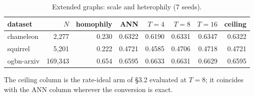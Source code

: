 \begin{table}[t]
\centering
\small
\caption{Extended graphs: scale and heterophily (7 seeds).}
\label{tab:ext}
\begin{tabular}{lrrrrrrr}
\toprule
dataset & $N$ & homophily & ANN & $T=4$ & $T=8$ & $T=16$ & ceiling \\
\midrule
chameleon & 2,277 & 0.230 & 0.6322 & 0.6190 & 0.6331 & 0.6347 & 0.6322 \\
squirrel & 5,201 & 0.222 & 0.4721 & 0.4585 & 0.4706 & 0.4718 & 0.4721 \\
ogbn-arxiv & 169,343 & 0.654 & 0.6595 & 0.6633 & 0.6631 & 0.6629 & 0.6595 \\
\bottomrule
\end{tabular}
\par\vspace{2pt}\footnotesize The ceiling column is the rate-ideal arm of \S3.2 evaluated at $T=8$; it coincides with the ANN column wherever the conversion is exact.
\end{table}
